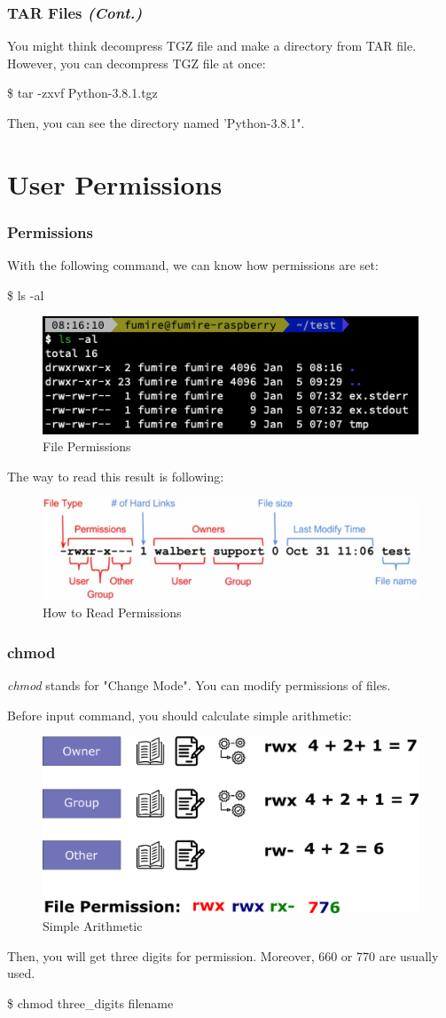 \documentclass{beamer}
\begin{document}
	\begin{frame}
		\frametitle{TAR Files \textit{(Cont.)}}
		You might think decompress TGZ file and make a directory from TAR file. However, you can decompress TGZ file at once:
		\begin{example}
			\$ tar -zxvf Python-3.8.1.tgz
		\end{example}
		Then, you can see the directory named 'Python-3.8.1".
	\end{frame}
	
	\section{User Permissions}
	
	\begin{frame}
		\frametitle{Permissions}
		With the following command, we can know how permissions are set:
		\begin{example}
			\$ ls -al
		\end{example}
	
		\begin{figure}[h!]
			\centering
			\includegraphics[width=0.4 \linewidth]{figures/11.png}
			\caption{File Permissions}
		\end{figure}
	
		The way to read this result is following:
		\begin{figure}[h!]
			\centering
			\includegraphics[width=0.5 \linewidth]{figures/permissions.jpg}
			\caption{How to Read Permissions}
		\end{figure}
	\end{frame}

	\begin{frame}
		\frametitle{chmod}
		\textit{chmod} stands for "Change Mode". You can modify permissions of files.
		
		Before input command, you should calculate simple arithmetic:
		\begin{figure}[h!]
			\centering
			\includegraphics[width=0.4 \linewidth]{figures/permissions2.png}
			\caption{Simple Arithmetic}
		\end{figure}
		Then, you will get three digits for permission. Moreover, 660 or 770 are usually used. 
	
		\begin{example}
			\$ chmod three\_digits filename
		\end{example}
	\end{frame}
\end{document}
